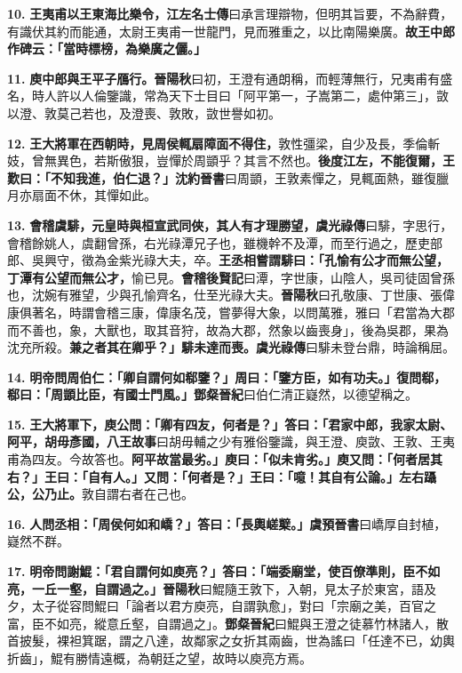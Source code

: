 \textbf{10.} \textbf{王夷甫以王東海比樂令，}{\footnotesize \textbf{江左名士傳}曰承言理辯物，但明其旨要，不為辭費，有識伏其約而能通，太尉王夷甫一世龍門，見而雅重之，以比南陽樂廣。}\textbf{故王中郎作碑云：「當時標榜，為樂廣之儷。」}

\textbf{11.} \textbf{庾中郎與王平子鴈行。}{\footnotesize \textbf{晉陽秋}曰初，王澄有通朗稱，而輕薄無行，兄夷甫有盛名，時人許以人倫鑒識，常為天下士目曰「阿平第一，子嵩第二，處仲第三」，敳以澄、敦莫己若也，及澄喪、敦敗，敳世譽如初。}

\textbf{12.} \textbf{王大將軍在西朝時，見周侯輒扇障面不得住，}{\footnotesize 敦性彊梁，自少及長，季倫斬妓，曾無異色，若斯傲狠，豈憚於周顗乎？其言不然也。}\textbf{後度江左，不能復爾，王歎曰：「不知我進，伯仁退？」}{\footnotesize \textbf{沈約晉書}曰周顗，王敦素憚之，見輒面熱，雖復臘月亦扇面不休，其憚如此。}

\textbf{13.} \textbf{會稽虞騑，元皇時與桓宣武同俠，其人有才理勝望，}{\footnotesize \textbf{虞光祿傳}曰騑，字思行，會稽餘姚人，虞翻曾孫，右光祿潭兄子也，雖機幹不及潭，而至行過之，歷吏部郎、吳興守，徵為金紫光祿大夫，卒。}\textbf{王丞相嘗謂騑曰：「孔愉有公才而無公望，丁潭有公望而無公才，}{\footnotesize 愉已見。\textbf{會稽後賢記}曰潭，字世康，山陰人，吳司徒固曾孫也，沈婉有雅望，少與孔愉齊名，仕至光祿大夫。\textbf{晉陽秋}曰孔敬康、丁世康、張偉康俱著名，時謂會稽三康，偉康名茂，嘗夢得大象，以問萬雅，雅曰「君當為大郡而不善也，象，大獸也，取其音狩，故為大郡，然象以齒喪身」，後為吳郡，果為沈充所殺。}\textbf{兼之者其在卿乎？」騑未達而喪。}{\footnotesize \textbf{虞光祿傳}曰騑未登台鼎，時論稱屈。}

\textbf{14.} \textbf{明帝問周伯仁：「卿自謂何如郗鑒？」周曰：「鑒方臣，如有功夫。」復問郗，郗曰：「周顗比臣，有國士門風。」}{\footnotesize \textbf{鄧粲晉紀}曰伯仁清正嶷然，以德望稱之。}

\textbf{15.} \textbf{王大將軍下，庾公問：「卿有四友，何者是？」答曰：「君家中郎，我家太尉、阿平，胡毋彥國，}{\footnotesize \textbf{八王故事}曰胡毋輔之少有雅俗鑒識，與王澄、庾敳、王敦、王夷甫為四友。今故答也。}\textbf{阿平故當最劣。」庾曰：「似未肯劣。」庾又問：「何者居其右？」王曰：「自有人。」又問：「何者是？」王曰：「噫！其自有公論。」左右躡公，公乃止。}{\footnotesize 敦自謂右者在己也。}

\textbf{16.} \textbf{人問丞相：「周侯何如和嶠？」答曰：「長輿嵯櫱。」}{\footnotesize \textbf{虞預晉書}曰嶠厚自封植，嶷然不群。}

\textbf{17.} \textbf{明帝問謝鯤：「君自謂何如庾亮？」答曰：「端委廟堂，使百僚準則，臣不如亮，一丘一壑，自謂過之。」}{\footnotesize \textbf{晉陽秋}曰鯤隨王敦下，入朝，見太子於東宮，語及夕，太子從容問鯤曰「論者以君方庾亮，自謂孰愈」，對曰「宗廟之美，百官之富，臣不如亮，縱意丘壑，自謂過之」。\textbf{鄧粲晉紀}曰鯤與王澄之徒慕竹林諸人，散首披髮，裸袒箕踞，謂之八達，故鄰家之女折其兩齒，世為謠曰「任達不已，幼輿折齒」，鯤有勝情遠概，為朝廷之望，故時以庾亮方焉。}

